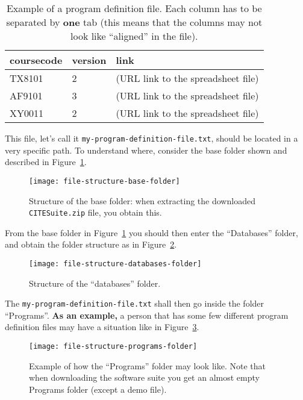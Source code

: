 \begin{table}[!htbp]
	\centering
	\caption{Example of a program definition file. Each column has to be separated by \textbf{one} tab (this means that the columns may not look like ``aligned'' in the file).}
	\label{tab:progexample}
	\ttfamily
	\begin{tabular}[t]{lll}
		\toprule
			coursecode & version & link \\
		\midrule
			TX8101 & 2 & (URL link to the spreadsheet file) \\
			AF9101 & 3 & (URL link to the spreadsheet file) \\
			XY0011 & 2 & (URL link to the spreadsheet file) \\
		\bottomrule
	\end{tabular}
\end{table}

This file, let's call it \texttt{my-program-definition-file.txt}, should be located in a very specific path. To understand where, consider the base folder shown and described in Figure~\ref{fig:file-structure-base-folder}.

\begin{figure}[!htbp]
	\centering
	\texttt{[image: file-structure-base-folder]}
	\caption{Structure of the base folder: when extracting the downloaded \texttt{CITESuite.zip} file, you obtain this.}
	\label{fig:file-structure-base-folder}
\end{figure}

From the base folder in Figure~\ref{fig:file-structure-base-folder} you should then enter the ``Databases'' folder, and obtain the folder structure as in Figure~\ref{fig:file-structure-databases-folder}.

\begin{figure}[!htbp]
	\centering
	\texttt{[image: file-structure-databases-folder]}
	\caption{Structure of the ``databases'' folder.}
	\label{fig:file-structure-databases-folder}
\end{figure}

The \texttt{my-program-definition-file.txt} shall then go inside the folder ``Programs''. \textbf{As an example,} a person that has some few different program definition files may have a situation like in Figure~\ref{fig:file-structure-programs-folder}.

\begin{figure}[!htbp]
	\centering
	\texttt{[image: file-structure-programs-folder]}
	\caption{Example of how the ``Programs'' folder may look like. Note that when downloading the software suite you get an almost empty Programs folder (except a demo file).}
	\label{fig:file-structure-programs-folder}
\end{figure}

